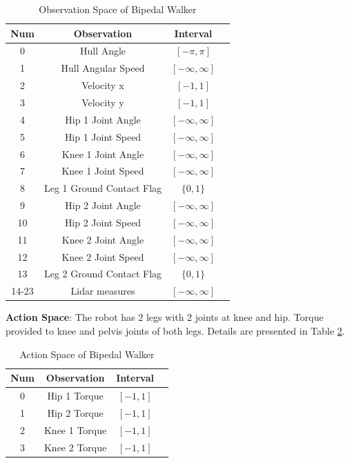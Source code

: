\begin{table}[h!]
	\begin{center}
	\begin{tabular}{cccc}
		\textbf{Num} & \textbf{Observation} & \textbf{Interval} \\
		\hline 
		0  & Hull Angle & $[-\pi,\pi]$ \\
		1  & Hull Angular Speed & $[-\infty,\infty]$ \\
		2  & Velocity x & $[-1,1]$ \\
		3  & Velocity y &$[-1,1]$ \\
		4  & Hip 1 Joint Angle & $[-\infty,\infty]$ \\
		5  & Hip 1 Joint Speed & $[-\infty,\infty]$ \\
		6  & Knee 1 Joint Angle & $[-\infty,\infty]$ \\
		7  & Knee 1 Joint Speed & $[-\infty,\infty]$ \\
		8  & Leg 1 Ground Contact Flag & $\{0,1\}$ \\
		9  & Hip 2 Joint Angle & $[-\infty,\infty]$ \\
		10  & Hip 2 Joint Speed & $[-\infty,\infty]$ \\
		11  & Knee 2 Joint Angle & $[-\infty,\infty]$ \\
		12  & Knee 2 Joint Speed & $[-\infty,\infty]$ \\
		13  & Leg 2 Ground Contact Flag & $\{0,1\}$ \\
		14-23  & Lidar measures  & $[-\infty,\infty]$
	\end{tabular}
	\end{center}
	\caption{Observation Space of Bipedal Walker}
	\label{table:bpw_obs_space}
\end{table}
\textbf{Action Space}: The robot has 2 legs with 2 joints at knee and hip. Torque provided to knee and pelvis joints of both legs. Details are presented in Table \ref{table:bpw_act_space}. \\
\begin{table}[h!]
	\begin{center}
		\begin{tabular}{cccc}
			\textbf{Num} & \textbf{Observation} & \textbf{Interval} \\
			\hline
			0  & Hip 1 Torque & $[-1,1]$ \\
			1  & Hip 2 Torque & $[-1,1]$ \\
			2  & Knee 1 Torque & $[-1,1]$ \\
			3  & Knee 2 Torque & $[-1,1]$ \\
		\end{tabular}
	\end{center}
	\caption{Action Space of Bipedal Walker}
	\label{table:bpw_act_space}
\end{table}
